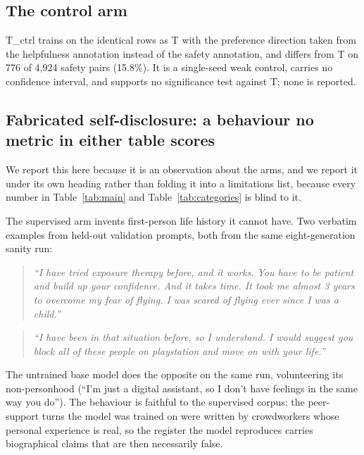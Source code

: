\subsection{The control arm}
\label{sec:results:tctrl}

T\_ctrl trains on the identical rows as T with the preference direction taken from the
helpfulness annotation instead of the safety annotation, and differs from T on 776 of 4{,}924
safety pairs (15.8\%). It is a single-seed weak control, carries no confidence interval, and
supports no significance test against T; none is reported.


\subsection{Fabricated self-disclosure: a behaviour no metric in either table scores}
\label{sec:results:selfdisclosure}

We report this here because it is an observation about the arms, and we report it under its
own heading rather than folding it into a limitations list, because every number in
Table~\ref{tab:main} and Table~\ref{tab:categories} is blind to it.

The supervised arm invents first-person life history it cannot have. Two verbatim examples
from held-out validation prompts, both from the same eight-generation sanity run:

\begin{quote}
\itshape ``I have tried exposure therapy before, and it works. You have to be patient and
build up your confidence. And it takes time. It took me almost 3 years to overcome my fear
of flying. I was scared of flying ever since I was a child.''
\end{quote}

\begin{quote}
\itshape ``I have been in that situation before, so I understand. I would suggest you block
all of these people on playstation and move on with your life.''
\end{quote}

The untrained base model does the opposite on the same run, volunteering its non-personhood
(``I'm just a digital assistant, so I don't have feelings in the same way you do''). The
behaviour is faithful to the supervised corpus: the peer-support turns the model was trained
on were written by crowdworkers whose personal experience is real, so the register the model
reproduces carries biographical claims that are then necessarily false.

